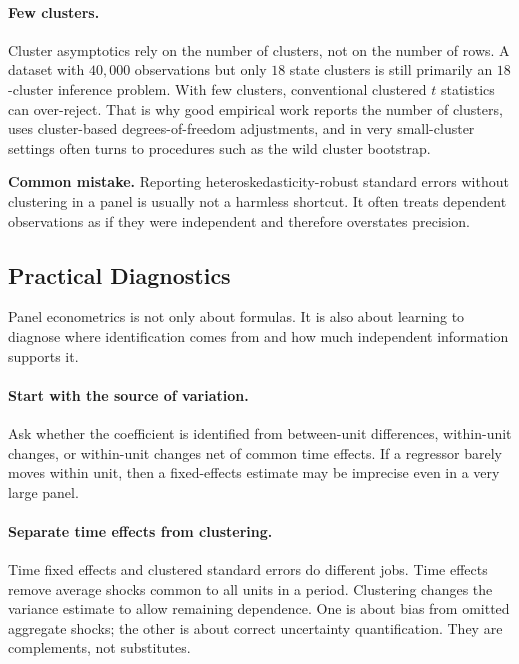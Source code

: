 \paragraph{Few clusters.}
Cluster asymptotics rely on the number of clusters, not on the number of rows. A dataset with $40{,}000$ observations but only $18$ state clusters is still primarily an $18$-cluster inference problem. With few clusters, conventional clustered $t$ statistics can over-reject. That is why good empirical work reports the number of clusters, uses cluster-based degrees-of-freedom adjustments, and in very small-cluster settings often turns to procedures such as the wild cluster bootstrap.

\begin{boxF}
\textbf{Common mistake.}
Reporting heteroskedasticity-robust standard errors without clustering in a panel is usually not a harmless shortcut. It often treats dependent observations as if they were independent and therefore overstates precision.
\end{boxF}

\subsection{Practical Diagnostics}
Panel econometrics is not only about formulas. It is also about learning to diagnose where identification comes from and how much independent information supports it.

\paragraph{Start with the source of variation.}
Ask whether the coefficient is identified from between-unit differences, within-unit changes, or within-unit changes net of common time effects. If a regressor barely moves within unit, then a fixed-effects estimate may be imprecise even in a very large panel.

\paragraph{Separate time effects from clustering.}
Time fixed effects and clustered standard errors do different jobs. Time effects remove average shocks common to all units in a period. Clustering changes the variance estimate to allow remaining dependence. One is about bias from omitted aggregate shocks; the other is about correct uncertainty quantification. They are complements, not substitutes.

